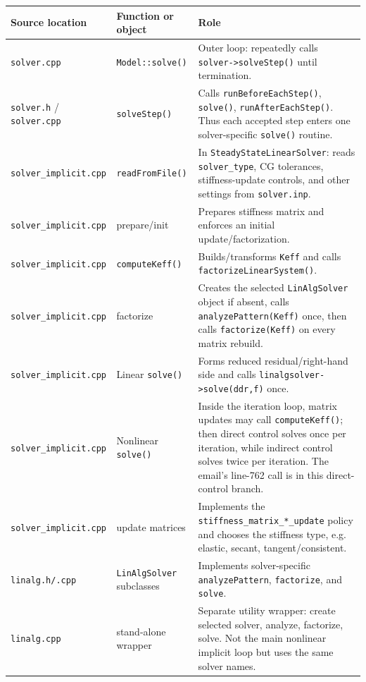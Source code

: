 \documentclass[10pt,a4paper]{article}
\newcommand{\code}[1]{\texttt{#1}}
\begin{document}
\begin{table}[h]
\small
\centering
\begin{tabularx}{\textwidth}{L{0.23\textwidth} L{0.20\textwidth} Y}
\toprule
Source location & Function or object & Role \\
\midrule
\code{solver.cpp} & \code{Model::solve()} & Outer loop: repeatedly calls \code{solver->solveStep()} until termination. \\
\code{solver.h} / \code{solver.cpp} & \code{solveStep()} & Calls \code{runBeforeEachStep()}, \code{solve()}, \code{runAfterEachStep()}. Thus each accepted step enters one solver-specific \code{solve()} routine. \\
\code{solver\_implicit.cpp} & \code{readFromFile()} & In \code{SteadyStateLinearSolver}: reads \code{solver\_type}, CG tolerances, stiffness-update controls, and other settings from \code{solver.inp}. \\
\code{solver\_implicit.cpp} & prepare/init & Prepares stiffness matrix and enforces an initial update/factorization. \\
\code{solver\_implicit.cpp} & \code{computeKeff()} & Builds/transforms \code{Keff} and calls \code{factorizeLinearSystem()}. \\
\code{solver\_implicit.cpp} & factorize & Creates the selected \code{LinAlgSolver} object if absent, calls \code{analyzePattern(Keff)} once, then calls \code{factorize(Keff)} on every matrix rebuild. \\
\code{solver\_implicit.cpp} & Linear \code{solve()} & Forms reduced residual/right-hand side and calls \code{linalgsolver->solve(ddr,f)} once. \\
\code{solver\_implicit.cpp} & Nonlinear \code{solve()} & Inside the iteration loop, matrix updates may call \code{computeKeff()}; then direct control solves once per iteration, while indirect control solves twice per iteration. The email's line-762 call is in this direct-control branch. \\
\code{solver\_implicit.cpp} & update matrices & Implements the \code{stiffness\_matrix\_*\_update} policy and chooses the stiffness type, e.g. elastic, secant, tangent/consistent. \\
\code{linalg.h/.cpp} & \code{LinAlgSolver} subclasses & Implements solver-specific \code{analyzePattern}, \code{factorize}, and \code{solve}. \\
\code{linalg.cpp} & stand-alone wrapper & Separate utility wrapper: create selected solver, analyze, factorize, solve. Not the main nonlinear implicit loop but uses the same solver names. \\
\bottomrule
\end{tabularx}
\end{table}
\end{document}
